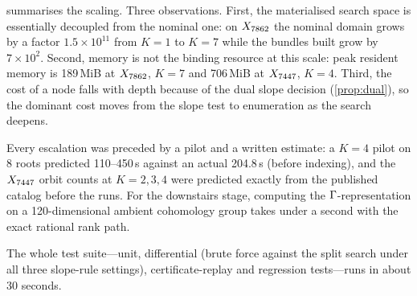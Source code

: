  summarises the scaling. Three observations. First, the
materialised search space is essentially decoupled from the nominal one: on
$X_{7862}$ the nominal domain grows by a factor $1.5\times10^{11}$ from $K=1$ to $K=7$
while the bundles built grow by $7\times10^{2}$. Second, memory is not the
binding resource at this scale: peak resident memory is 189\,MiB at $X_{7862}$, $K=7$
and 706\,MiB at $X_{7447}$, $K=4$. Third, the cost of a node falls with depth because
of the dual slope decision (\cref{prop:dual}), so the dominant cost moves from
the slope test to enumeration as the search deepens.

Every escalation was preceded by a pilot and a written estimate: a $K=4$ pilot
on 8 roots predicted 110--450\,s against an actual 204.8\,s (before indexing),
and the $X_{7447}$ orbit counts at $K=2,3,4$ were predicted exactly from the
published catalog before the runs. For the downstairs stage, computing the
$\Gamma$-representation on a 120-dimensional ambient cohomology group takes under
a second with the exact rational rank path.

The whole test suite---unit, differential (brute force against the split search
under all three slope-rule settings), certificate-replay and regression
tests---runs in about 30 seconds.
